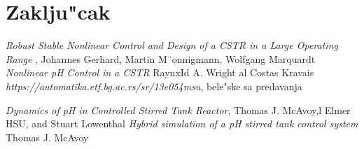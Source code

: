 \documentclass[a4paper,11pt]{article}
\theoremstyle{definition} \newtheorem{deff}{Definicija}[section]
\theoremstyle{definition} \newtheorem{prim}[deff]{Primer}
\theoremstyle{plain} \newtheorem{teor}[deff]{Teorema}
\begin{document}
	
	\section{Zaklju"cak}
	
	
	\newpage
	
	\begin{thebibliography}{9}
		\emph{Robust Stable Nonlinear Control
			and Design of a CSTR in a Large
			Operating Range
		}, Johannes Gerhard, Martin M¨onnigmann,
		Wolfgang Marquardt
		\bibitem{}\emph{Nonlinear pH Control in a CSTR
		} RaynxId A. Wright al Costas Kravais
		\emph{https://automatika.etf.bg.ac.rs/sr/13e054msu}, bele"ske sa predavanja
		
		
		
		\emph{Dynamics of pH in Controlled Stirred Tank Reactor}, Thomas J. McAvoy,l Elmer HSU, and Stuart Lowenthal
		\bibitem{}\emph{Hybrid simulation of a pH stirred
			tank control system} Thomas J. McAvoy
		
		
	\end{thebibliography}
\end{document}
